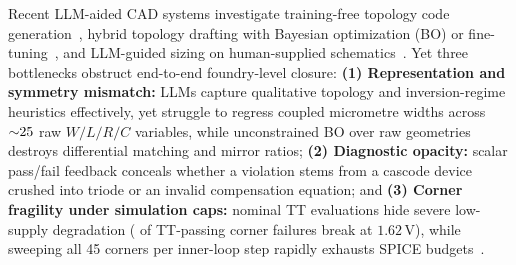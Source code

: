 \documentclass[sigconf,review,anonymous]{acmart}
\begin{document}
Recent LLM-aided CAD systems investigate training-free topology code generation~\cite{lai2025analogcoder,bao2026analogagent,chen2025menter}, hybrid topology drafting with Bayesian optimization (BO) or fine-tuning~\cite{lai2026analogcoderpro,wang2025analogsage,habib2026aallm,huang2026saftac}, and LLM-guided sizing on human-supplied schematics~\cite{yin2024adollm,kochar2025ledro,ahmadzadeh2025anaflow,yu2026autosizer,hao2026agenticsizing,long2026analogscout,saxena2026opera,park2026craft}. Yet three bottlenecks obstruct end-to-end foundry-level closure:
\textbf{(1) Representation and symmetry mismatch:} LLMs capture qualitative topology and inversion-regime heuristics effectively, yet struggle to regress coupled micrometre widths across ${\sim}25{}$ raw $W/L/R/C$ variables, while unconstrained BO over raw geometries destroys differential matching and mirror ratios;
\textbf{(2) Diagnostic opacity:} scalar pass/fail feedback conceals whether a violation stems from a cascode device crushed into triode or an invalid compensation equation; and
\textbf{(3) Corner fragility under simulation caps:} nominal TT evaluations hide severe low-supply degradation (\PVTFailLowVdd{} of TT-passing corner failures break at $1.62\,\mathrm{V}$), while sweeping all 45 corners per inner-loop step rapidly exhausts SPICE budgets~\cite{adbench2026longhorizon}.
\end{document}
